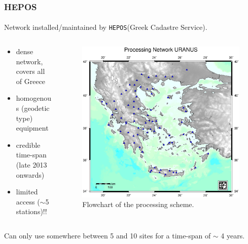 \documentclass{beamer}
\begin{document}
\begin{frame}\frametitle{HEPOS}\framesubtitle{}
  Network installed/maintained by \texttt{HEPOS}\footnotemark (Greek Cadastre Service). 
\begin{columns}[T] %
\begin{column}{.48\textwidth}
  \begin{itemize}
    \item<pro@1-> dense network, covers all of Greece
    \item<pro@1-> homogenous (geodetic type) equipment
    \item<con@1-> credible time-span (late 2013 onwards)
    \item<con@1-> limited access ($\sim$5 stations)!!
  \end{itemize}
\end{column}%
\hfill%
\begin{column}{.68\textwidth}
 \begin{figure}
 \begin{center}
 \includegraphics[width=.5\textwidth]{img/uranusnet.eps}
 \caption{Flowchart of the processing scheme.}
 \label{fig:dgrm}
 \end{center}
 \end{figure}
\end{column}%
\end{columns}
  \begin{block}{}
  Can only use somewhere between 5 and 10 sites for a time-span of $\sim$ 4 years.
  \end{block}
\end{frame}
\end{document}
